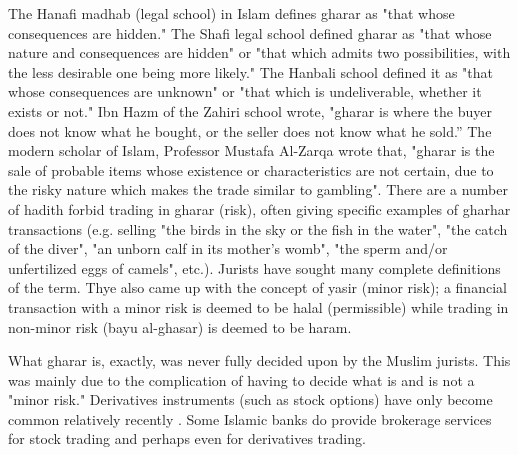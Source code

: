 The Hanafi madhab (legal school) in Islam defines gharar as "that whose consequences are hidden." The Shafi legal school defined gharar as "that whose nature and consequences are hidden" or "that which admits two possibilities, with the less desirable one being more likely." The Hanbali school defined it as "that whose consequences are unknown" or "that which is undeliverable, whether it exists or not." Ibn Hazm of the Zahiri school wrote, "gharar is where the buyer does not know what he bought, or the seller does not know what he sold.” The modern scholar of Islam, Professor Mustafa Al-Zarqa wrote that, "gharar is the sale of probable items whose existence or characteristics are not certain, due to the risky nature which makes the trade similar to gambling". There are a number of hadith forbid trading in gharar (risk), often giving specific examples of gharhar transactions (e.g. selling "the birds in the sky or the fish in the water", "the catch of the diver", "an unborn calf in its mother’s womb", "the sperm and/or unfertilized eggs of camels", etc.). Jurists have sought many complete definitions of the term. Thye also came up with the concept of yasir (minor risk); a financial transaction with a minor risk is deemed to be halal (permissible) while trading in non-minor risk (bayu al-ghasar) is deemed to be haram. 

What gharar is, exactly, was never fully decided upon by the Muslim jurists. This was mainly due to the complication of having to decide what is and is not a "minor risk." Derivatives instruments (such as stock options) have only become common relatively recently . Some Islamic banks do provide brokerage services for stock trading and perhaps even for derivatives trading.


